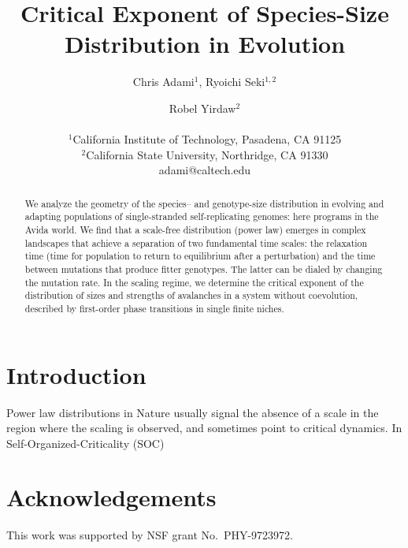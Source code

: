 \documentclass[letterpaper]{article}
\title{Critical Exponent of Species-Size Distribution in Evolution}
\author{Chris Adami$^{1}$, Ryoichi Seki$^{1,2}$ \and Robel Yirdaw$^2$ \\
\mbox{}\\	
$^1$California Institute of Technology, Pasadena, CA 91125 \\
$^2$California State University, Northridge, CA 91330 \\
adami@caltech.edu}
\begin{document}
\maketitle

\begin{abstract}
  We analyze the geometry of the species-- and genotype-size
  distribution in evolving and adapting populations of single-stranded
  self-replicating genomes: here programs in the Avida world.  We find
  that a scale-free distribution (power law) emerges in complex
  landscapes that achieve a separation of two fundamental time scales:
  the relaxation time (time for population to return to equilibrium
  after a perturbation) and the time between mutations that produce
  fitter genotypes. The latter can be dialed by changing the mutation
  rate.  In the scaling regime, we determine the
  critical exponent of the distribution of sizes and strengths of
  avalanches in a system without coevolution, described by first-order
  phase transitions in single finite niches.
\end{abstract}

\section{Introduction}

Power law distributions in Nature usually signal the absence of a
scale in the region where the scaling is observed, and sometimes point
to critical dynamics. In Self-Organized-Criticality (SOC)
\citep{BTW87,BTW88}
\section{Acknowledgements}

This work was supported by NSF grant No.\ PHY-9723972.

\footnotesize


\end{document}
